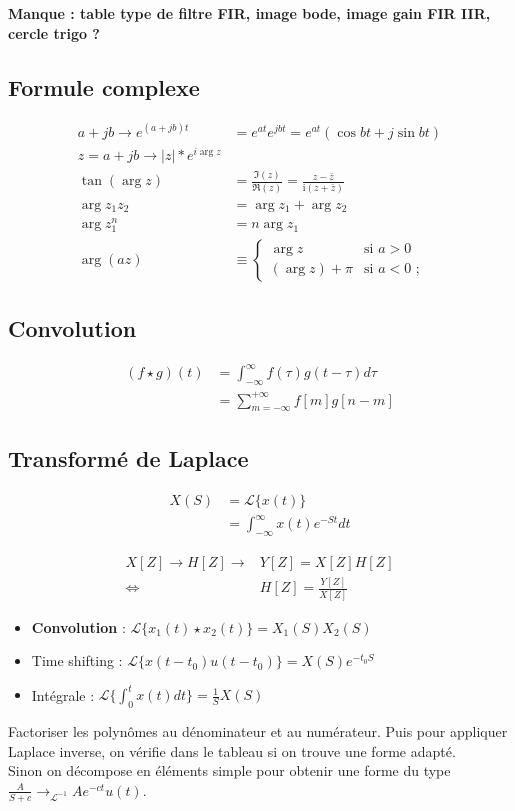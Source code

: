 \documentclass[9pt]{article}
\begin{document}
\footnotesize   
\begin{multicols}{3}
\textbf{Manque : table type de filtre FIR, image bode, image gain FIR IIR, cercle trigo ?}
\subsection{Formule complexe}
\begin{align*}
    a + jb \to e^{(a+jb)t} &= e^{at}e^{jbt} = e^{at}(\cos bt + j \sin bt) \\
    z = a + jb \to \left| z \right| * e^{i \arg z} \\
    \tan(\arg z)&={\frac {\Im (z)}{\Re (z)}}={\frac {z-{\bar {z}}}{\mathrm {i} \left(z+{\bar {z}}\right)}} \\
    \arg z_1z_2 &= \arg z_1 + \arg z_2 \\
    \arg z_1^n &= n\arg z_1 \\
    \arg(az) &\equiv {\begin{cases}\arg z&{\text{si }}a>0\\(\arg z)+\pi &{\text{si }}a<0{\text{ ;}}\end{cases}}
\end{align*}

\subsection{Convolution}
\begin{align*}
    (f \star g)(t) &= \int _{-\infty }^{\infty }f(\tau )g(t-\tau )d\tau \\
                    &= \sum_{m=-\infty }^{+\infty} f[m]g[n - m]
\end{align*}

\subsection{Transformé de Laplace}
\begin{align*}
    X(S) &= \mathcal{L}\{x(t)\} \\
        &= \int_{-\infty }^{\infty }x(t)e^{-St}dt
\end{align*}

\begin{align*}
    X[Z] \to H[Z] \to &Y[Z] = X[Z]H[Z] \\
    \Leftrightarrow & H[Z] = \frac{Y[Z]}{X[Z]}
\end{align*}

\begin{itemize}
    \item \textbf{Convolution} : $ \mathcal{L}\{x_1(t) \star x_2(t)\} = X_1(S) X_2(S)$ 
    \item Time shifting : $ \mathcal{L}\{x(t-t_0) u(t - t_0)\} = X(S)e^{-t_0 S}$ 
    \item Intégrale : $ \mathcal{L}\{\int_{0}^{t}x(t)dt\} = \frac{1}{S}X(S) $ 
\end{itemize}
Factoriser les polynômes au dénominateur et au numérateur. Puis pour appliquer Laplace inverse, on vérifie dans le tableau si on trouve une forme adapté. \\
Sinon on décompose en éléments simple pour obtenir une forme du type $ \frac{A}{S+c} \to _{\mathcal{L}^{-1}} A e^{-ct}u(t)$.


\end{multicols}
\end{document}
